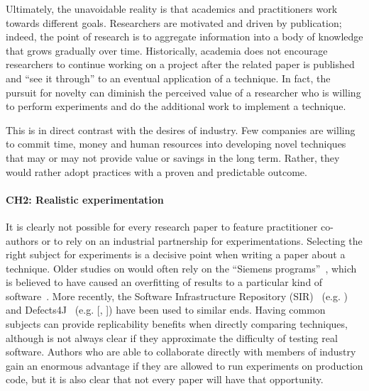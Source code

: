 Ultimately, the unavoidable reality is that academics and practitioners work towards different goals.
Researchers are motivated and driven by publication; indeed, the point of research is to aggregate information into a body of knowledge that grows gradually over time.
Historically, academia does not encourage researchers to continue working on a project after the related paper is published and ``see it through'' to an eventual application of a technique.
In fact, the pursuit for novelty can diminish the perceived value of a researcher who is willing to perform experiments and do the additional work to implement a technique.

This is in direct contrast with the desires of industry.
Few companies are willing to commit time, money and human resources into developing novel techniques that may or may not provide value or savings in the long term.
Rather, they would rather adopt practices with a proven and predictable outcome.


\paragraph{CH2: Realistic experimentation}
It is clearly not possible for every research paper to feature practitioner co-authors or to rely on an industrial partnership for experimentations.
Selecting the right subject for experiments is a decisive point when writing a paper about a technique.
Older studies on \rt would often rely on the ``Siemens programs''~\cite{hutchins1994experiments}, which is believed to have caused an overfitting of results to a particular kind of software~\cite{do_recent_2016}.
More recently, the Software Infrastructure Repository (SIR)~\cite{do2005supporting} (e.g. ) and Defects4J~\cite{just2014defects4j} (e.g. [, ]) have been used to similar ends.
Having common subjects can provide replicability benefits when directly comparing techniques, although is not always clear if they approximate the difficulty of testing real software.
Authors who are able to collaborate directly with members of industry gain an enormous advantage if they are allowed to run experiments on production code, but it is also clear that not every paper will have that opportunity.

